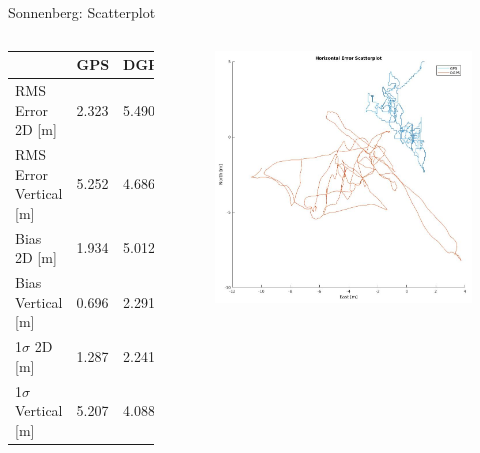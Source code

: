 \documentclass[12pt, compress, xcolor=table]{beamer}
\begin{document}
\begin{frame}{Sonnenberg: Scatterplot}
 \begin{columns}
  
  \begin{table}[]
  \centering
  \scriptsize
  \begin{tabular}{l|ll}
			    & GPS   & DGPS  \\ \hline
  RMS Error 2D {[}m{]}       & 2.323 & 5.490 \\
  RMS Error Vertical {[}m{]} & 5.252 & 4.686 \\
  Bias 2D {[}m{]}            & 1.934 & 5.012 \\
  Bias Vertical {[}m{]}      & 0.696 & 2.291 \\
  1$\sigma$ 2D {[}m{]}       & 1.287 & 2.241 \\
  1$\sigma$ Vertical {[}m{]} & 5.207 & 4.088
  \end{tabular}
  \end{table}
  
  \begin{figure}
   \centering
   \includegraphics[width=\textwidth]{images/Scatterplot_Sonnenberg.png}
  \end{figure}
  
 \end{columns}
\end{frame}
\end{document}

